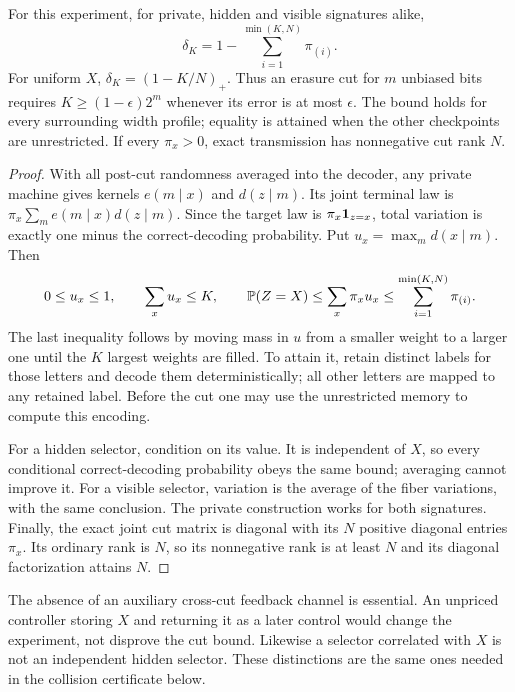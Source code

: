 \begin{theorem}
\label{thm:v18-cut}
For this experiment, for private, hidden and visible signatures alike,
\begin{equation}\label{eq:v18-cutvalue}
 \delta_K=1-\sum_{i=1}^{\min(K,N)}\pi_{(i)}.
\end{equation}
For uniform $X$, $\delta_K=(1-K/N)_+$. Thus an erasure cut for $m$
unbiased bits requires $K\ge(1-\epsilon)2^m$ whenever its error is at most
$\epsilon$. The bound holds for every surrounding width profile; equality
is attained when the other checkpoints are unrestricted. If every
$\pi_x>0$, exact transmission has nonnegative cut rank $N$.
\end{theorem}
\begin{proof}
With all post-cut randomness averaged into the decoder, any private
machine gives kernels $e(m\mid x)$ and $d(z\mid m)$. Its joint terminal
law is $\pi_x\sum_m e(m\mid x)d(z\mid m)$. Since the target law is
$\pi_x\mathbf 1_{z=x}$, total variation is exactly one minus the correct-decoding
probability. Put $u_x=\max_m d(x\mid m)$. Then
\[
 0\le u_x\le1,\qquad \sum_xu_x\le K,\qquad
 \mathbb P(Z=X)\le\sum_x\pi_xu_x
                  \le\sum_{i=1}^{\min(K,N)}\pi_{(i)}.
\]
The last inequality follows by moving mass in $u$ from a smaller weight
to a larger one until the $K$ largest weights are filled. To attain it,
retain distinct labels for those letters and decode them deterministically;
all other letters are mapped to any retained label. Before the cut one may
use the unrestricted memory to compute this encoding.

For a hidden selector, condition on its value. It is independent of $X$,
so every conditional correct-decoding probability obeys the same bound;
averaging cannot improve it. For a visible selector, variation is the
average of the fiber variations, with the same conclusion. The private
construction works for both signatures. Finally, the exact joint cut
matrix is diagonal with its $N$ positive diagonal entries $\pi_x$.
Its ordinary rank is $N$, so its nonnegative rank is at least $N$ and
its diagonal factorization attains $N$.
\end{proof}

The absence of an auxiliary cross-cut feedback channel is essential. An
unpriced controller storing $X$ and returning it as a later control would
change the experiment, not disprove the cut bound. Likewise a selector
correlated with $X$ is not an independent hidden selector. These distinctions
are the same ones needed in the collision certificate below.
